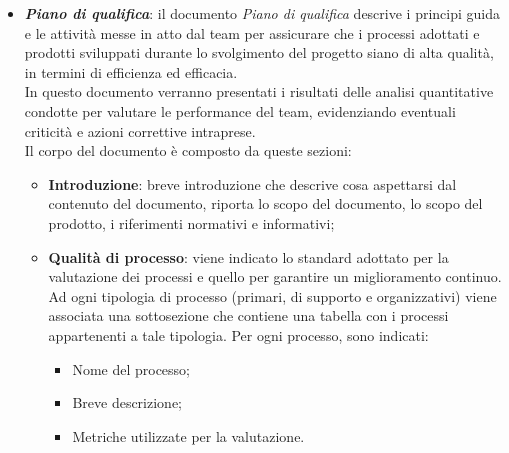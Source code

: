 \begin{itemize}
      \item \textit{\textbf{Piano di qualifica}}: il documento \textit{Piano di qualifica} descrive i principi guida e le attività messe in atto dal team per assicurare che i processi
            adottati e prodotti sviluppati durante lo svolgimento del progetto siano di alta qualità, in termini di efficienza ed efficacia.\\
            In questo documento verranno presentati i risultati delle analisi quantitative condotte per valutare le performance del team, evidenziando eventuali criticità e azioni correttive intraprese.
            \\Il corpo del documento è composto da queste sezioni:
            \begin{itemize}
                  \item \textbf{Introduzione}: breve introduzione che descrive cosa aspettarsi dal contenuto del documento, riporta lo scopo del documento, lo scopo del prodotto, i riferimenti normativi e informativi;
                  \item \textbf{Qualità di processo}: viene indicato lo standard adottato per la valutazione dei processi e quello per garantire un miglioramento continuo.\\
                        Ad ogni tipologia di processo (primari, di supporto e organizzativi) viene associata una sottosezione che contiene una tabella con
                        i processi appartenenti a tale tipologia. Per ogni processo, sono indicati:
                        \begin{itemize}
                              \item Nome del processo;
                              \item Breve descrizione;
                              \item Metriche utilizzate per la valutazione.
                        \end{itemize}


\end{itemize}
\end{itemize}
